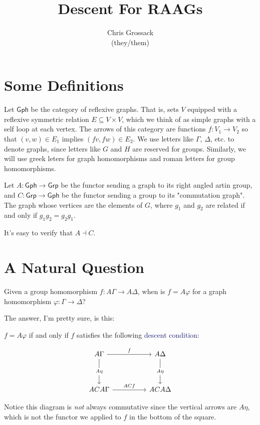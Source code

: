 \documentclass[12pt]{article}
\author{Chris Grossack\\ (they/them)}
\title{Descent For RAAGs}
\theoremstyle{definition}
\theoremstyle{theorem}
\newcommand*{\important}[1]{\textcolor{MidnightBlue}{#1}}
\begin{document}
\maketitle

\section{Some Definitions}

Let $\mathsf{Gph}$ be the category of reflexive graphs. That is, sets $V$ 
equipped with a reflexive symmetric relation $E \subseteq V \times V$, which
we think of as simple graphs with a self loop at each vertex. The arrows of
this category are functions $f : V_1 \to V_2$ so that $(v,w) \in E_1$ implies
$(fv,fw) \in E_2$. We use letters like $\Gamma$, $\Delta$, etc. to denote 
graphs, since letters like $G$ and $H$ are reserved for groups. Similarly,
we will use greek leters for graph homomorphisms and roman letters for
group homomorphisms.

Let $A : \mathsf{Gph} \to \mathsf{Grp}$ be the functor sending a graph to its
right angled artin group, and $C : \mathsf{Grp} \to \mathsf{Gph}$ be the functor
sending a group to its "commutation graph". The graph whose vertices are the 
elements of $G$, where $g_1$ and $g_2$ are related if and only if $g_1g_2 = g_2g_1$.

It's easy to verify that $A \dashv C$.

\section{A Natural Question}

Given a group homomorphism $f : A\Gamma \to A\Delta$, when is $f = A \varphi$
for a graph homomorphism $\varphi : \Gamma \to \Delta$?

The answer, I'm pretty sure, is this:

$f = A \varphi$ if and only if $f$ satisfies the following \important{descent condition}:

\[\begin{tikzcd}
	A\Gamma && A\Delta \\
	\\
	ACA\Gamma && ACA\Delta
	\arrow["f", from=1-1, to=1-3]
	\arrow["ACf", from=3-1, to=3-3]
	\arrow["{A \eta}"{description}, from=1-1, to=3-1]
	\arrow["A\eta"{description}, from=1-3, to=3-3]
\end{tikzcd}\]

Notice this diagram is \emph{not} always commutative since the vertical arrows
are $A \eta$, which is not the functor we applied to $f$ in the bottom of the square.
\end{document}
